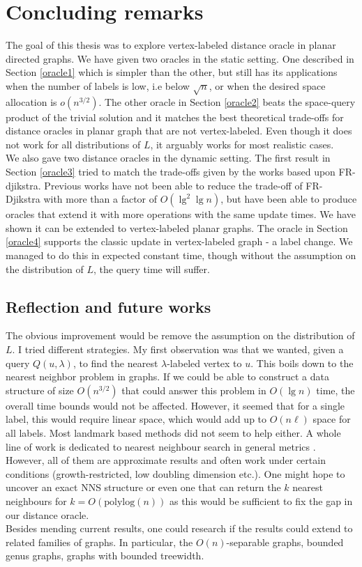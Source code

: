 \section{Concluding remarks}\label{conclusion}
The goal of this thesis was to explore vertex-labeled distance oracle in planar directed
graphs. We have given two oracles in the static setting. One described in Section
\ref{oracle1} which is simpler than the
other, but still has its applications when the number of labels is low, i.e below
$\sqrt{n}$, or when the desired space allocation is $o(n^{3/2})$. The other oracle in
Section \ref{oracle2} beats
the space-query product of the trivial solution and it matches the best theoretical
trade-offs for distance oracles in planar graph that are not vertex-labeled. Even though
it does not work for all distributions of $L$, it arguably works for most realistic
cases. \\
We also gave two distance oracles in the dynamic setting. The first result in Section
\ref{oracle3} tried to match the
trade-offs given by the works based upon FR-djikstra. Previous works have not been able
to reduce the trade-off of FR-Djikstra with more than a factor of $O(\lg^2\lg n)$, but
have been able to produce oracles that extend it with more operations with the same
update times. We have shown it can be extended to vertex-labeled planar graphs. The
oracle in Section \ref{oracle4} supports the classic update in vertex-labeled graph - a
label change. We managed to do this in expected constant time, though without the
assumption on the distribution of $L$, the query time will suffer.

\subsection{Reflection and future works}
The obvious improvement would be remove the assumption on the distribution of $L$. I
tried different strategies. My first observation was that we wanted, given a query
$Q(u,\lambda)$, to find the nearest $\lambda$-labeled vertex to $u$. This boils down to
the nearest neighbor problem in graphs. If we could be able to construct a data structure
of size $O(n^{3/2})$ that could answer this problem in $O(\lg n)$ time, the overall time
bounds would not be affected. However, it seemed that for a single label, this would
require linear space, which would add up to $O(n\ell)$ space for all labels. Most
landmark based methods did not seem to help either. A whole line of work is dedicated to
nearest neighbour search in general metrics
\cite{krauthgamer2004navigating}\cite{krauthgamer2005black}\cite{karger2002finding}\cite{plaxton1999accessing}\cite{beygelzimer2006cover}\cite{cole2006searching}.
However, all of them are approximate results and often work under certain conditions
(growth-restricted, low doubling dimension etc.). One might hope to uncover an exact NNS
structure or even one that can return the $k$ nearest neighbours for
$k=O(\text{polylog}(n))$ as this would be sufficient to fix the gap in our distance
oracle. \\
Besides mending current results, one could research if the results could extend to related
families of graphs. In particular, the $O(n)$-separable graphs, bounded genus graphs,
graphs with bounded treewidth.
